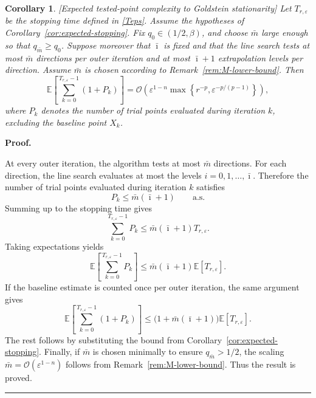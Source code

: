 \documentclass[11pt,a4paper]{article}
\newtheorem{corollary}{Corollary}[section]
\newenvironment{proof}[1][Proof]{%
  \par\noindent\textbf{#1.}\ %
}{%
  \par\vspace{-0.5 ex}            %
  \noindent\hfill\rule{0.5em}{0.5em}\par
  \vspace{1ex}
}
\newcommand{\Imax}{\bar{\imath}}%
\newcommand{\Dexp}{p}
\newcommand{\goldelta}{r}
\begin{document}
\begin{corollary}\label{cor:finalcompl}[Expected tested-point complexity to Goldstein stationarity]
\label{cor:tested-point-Goldstein}
Let \(T_{\goldelta,\varepsilon}\) be the stopping time defined in
\eqref{Teps}. Assume the hypotheses of Corollary~\ref{cor:expected-stopping}. 
Fix $q_0\in(1/2,\beta)$, and choose \(\bar{m}\) large enough so that
\(q_{\bar{m}}\ge q_0\). Suppose moreover that \(\Imax\) is fixed and that the
line search tests at most \(\bar{m}\) directions per outer iteration and at most
\(\Imax+1\) extrapolation levels per direction. Assume $\bar{m}$ is chosen
according to Remark~\ref{rem:M-lower-bound}. Then
\[
    \mathbb E\!\left[
        \sum_{k=0}^{T_{\goldelta,\varepsilon}-1} (1+P_k)
    \right]
    =
    \mathcal O\left(
        \varepsilon^{1-n}
        \max\left\{
            \goldelta^{-\Dexp},
            \varepsilon^{-\Dexp/(\Dexp-1)}
        \right\}
    \right),
\]
where \(P_k\) denotes the number of trial points evaluated during iteration
\(k\), excluding the baseline point \(X_k\).


\end{corollary}
\begin{proof}
At every outer iteration, the algorithm tests at most \(\bar{m}\) directions. For
each direction, the line search evaluates at most the levels
$ i=0,1,\ldots,\Imax.$
Therefore the number of trial points evaluated during iteration \(k\) satisfies
\[
    P_k\le \bar{m}(\Imax+1)
    \qquad\text{a.s.}
\]
Summing up to the stopping time gives
\[
    \sum_{k=0}^{T_{\goldelta,\varepsilon}-1} P_k
    \le
    \bar{m}(\Imax+1)T_{\goldelta,\varepsilon}.
\]
Taking expectations yields
\[
    \mathbb E\!\left[
        \sum_{k=0}^{T_{\goldelta,\varepsilon}-1} P_k
    \right]
    \le
    \bar{m}(\Imax+1)\mathbb E[T_{\goldelta,\varepsilon}].
\]
If the baseline estimate is counted once per outer iteration, the same argument
gives
\[
    \mathbb E\!\left[
        \sum_{k=0}^{T_{\goldelta,\varepsilon}-1} (1+P_k)
    \right]
    \le
    \bigl(1+\bar{m}(\Imax+1)\bigr)
    \mathbb E[T_{\goldelta,\varepsilon}].
\]
The rest follows by substituting the bound from
Corollary~\ref{cor:expected-stopping}. Finally, if \(\bar{m}\) is chosen minimally to ensure
\(q_{\bar{m}}>1/2\), the scaling \(\bar{m}=\mathcal O(\varepsilon^{1-n})\) follows from
Remark~\ref{rem:M-lower-bound}. Thus the result is proved.

\end{proof}
\end{document}
